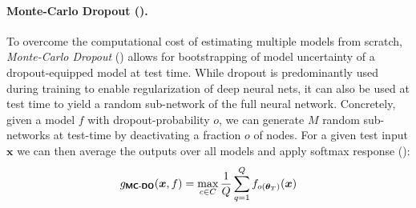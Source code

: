  \paragraph{Monte-Carlo Dropout (\mcdo).} 
  To overcome the computational cost of estimating multiple models from scratch, \emph{Monte-Carlo Dropout} (\mcdo) \citep{gal2016dropout} allows for bootstrapping of model uncertainty of a dropout-equipped model at test time. While dropout is predominantly used during training to enable regularization of deep neural nets, it can also be used at test time to yield a random sub-network of the full neural network. Concretely, given a model $f$ with dropout-probability $o$, we can generate $M$ random sub-networks at test-time by deactivating a fraction $o$ of nodes. For a given test input $\bm{x}$ we can then average the outputs over all models and apply softmax response (\sr):
 \begin{equation}
 	g_{\textbf{\sffamily MC-DO}}(\bm{x}, f) = \max_{c \in C} \frac{1}{Q} \sum_{q=1}^{Q} f_{o(\bm{\theta}_{T})}(\bm{x})
 \end{equation}









